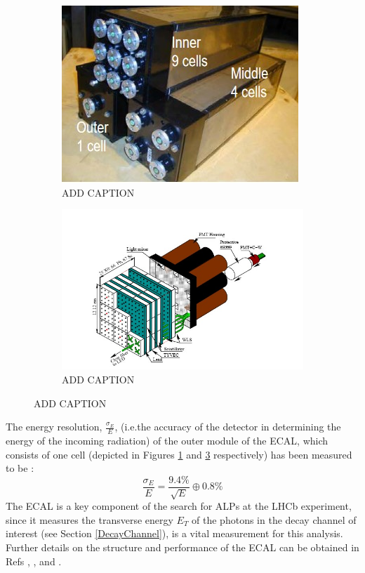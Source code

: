 \begin{figure}[H]
    \begin{subfigure}{0.4\textwidth}
    \includegraphics[scale = 0.75]{ECALModule.jpg}
    \caption{ADD CAPTION}
    \label{ECALModule}
    \end{subfigure}
    \hfill
    \begin{subfigure}{0.5\textwidth}
        \includegraphics[scale = 0.65]{ECALStructure.jpg}
        \caption{ADD CAPTION}
        \label{ECALStructure}
    \end{subfigure}
    \hfill
\end{figure}
The energy resolution, $\frac{\sigma_{E}}{E}$, (i.e.the accuracy of the detector in determining the energy of the incoming radiation) of the outer module of the ECAL, which consists of one cell (depicted in Figures \ref{ECALModule} and \ref{ECALStructure} respectively) has been measured to be \cite{GOLUTVIN2003258}:
\begin{equation}
    \frac{\sigma_{E}}{E} = \frac{9.4\%}{\sqrt{E}}\oplus 0.8\%
\end{equation}
The ECAL is a key component of the search for ALPs at the LHCb experiment, since it measures the transverse energy $E_{T}$ of the photons in the decay channel of interest (see Section \ref{DecayChannel}), is a vital measurement for this analysis. Further details on the structure and performance of the ECAL can be obtained in Refs \cite{Amato:494264}, \cite{AbellanBeteta:2020amj}, and \cite{GOLUTVIN2003258}.
